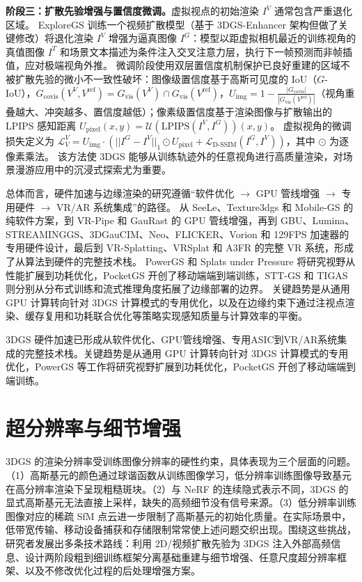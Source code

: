 \textbf{阶段三：扩散先验增强与置信度微调。}虚拟视点的初始渲染 $I^V$ 通常包含严重退化区域。
ExploreGS 训练一个视频扩散模型（基于 3DGS-Enhancer 架构但做了关键修改）将退化渲染 $I^V$ 增强为逼真图像 $I^G$：模型以距虚拟相机最近的训练视角的真值图像 $I^T$ 和场景文本描述为条件注入交叉注意力层，执行下一帧预测而非帧插值，应对极端视角外推。
微调阶段使用双层置信度机制保护已良好重建的区域不被扩散先验的微小不一致性破坏：图像级置信度基于高斯可见度的 IoU（$G$-IoU），$G_\text{covis}(V^V, V^\text{ref}) = G_\text{vis}(V^V) \cap G_\text{vis}(V^\text{ref})$，$U_\text{img} = 1 - \frac{|G_\text{covis}|}{|G_\text{vis}(V^\text{ref})|}$（视角重叠越大、冲突越多、置信度越低）；像素级置信度基于渲染图像与扩散输出的 LPIPS 感知距离 $U_\text{pixel}(x,y) = \mathcal{U}(\text{LPIPS}(I^V, I^G))(x,y)$。
虚拟视角的微调损失定义为 $\mathcal{L}_V^V = U_\text{img} \cdot (||I^G - I^V||_1 \odot U_\text{pixel} + \mathcal{L}_\text{D-SSIM}(I^G, I^V))$，其中 $\odot$ 为逐像素乘法。
该方法使 3DGS 能够从训练轨迹外的任意视角进行高质量渲染，对场景漫游应用中的沉浸式探索尤为重要。

总体而言，硬件加速与边缘渲染的研究遵循“软件优化 $\to$ GPU 管线增强 $\to$ 专用硬件 $\to$ VR/AR 系统集成”的路径。
从 SeeLe、Texture3dgs 和 Mobile-GS 的纯软件方案，到 VR-Pipe 和 GauRast 的 GPU 管线增强，再到 GBU、Lumina、STREAMINGGS、3DGauCIM、Neo、FLICKER、Vorion 和 129FPS 加速器的专用硬件设计，最后到 VR-Splatting、VRSplat 和 A3FR 的完整 VR 系统，形成了从算法到硬件的完整技术栈。
PowerGS 和 Splats under Pressure 将研究视野从性能扩展到功耗优化，PocketGS 开创了移动端端到端训练，STT-GS 和 TIGAS 则分别从分布式训练和流式推理角度拓展了边缘部署的边界。
关键趋势是从通用 GPU 计算转向针对 3DGS 计算模式的专用优化，以及在边缘约束下通过注视点渲染、缓存复用和功耗联合优化等策略实现感知质量与计算效率的平衡。

\begin{takeaway}
3DGS 硬件加速已形成从软件优化、GPU管线增强、专用ASIC到VR/AR系统集成的完整技术栈。关键趋势是从通用 GPU 计算转向针对 3DGS 计算模式的专用优化，PowerGS 等工作将研究视野扩展到功耗优化，PocketGS 开创了移动端端到端训练。
\end{takeaway}

\section{超分辨率与细节增强}
\label{sec:02_8}

3DGS 的渲染分辨率受训练图像分辨率的硬性约束，具体表现为三个层面的问题。（1）高斯基元的颜色通过球谐函数从训练图像学习，低分辨率训练图像导致基元在高分辨率渲染下呈现粗糙斑块。（2）与 NeRF 的连续隐式表示不同，3DGS 的显式高斯基元无法直接上采样，缺失的高频细节没有信号来源。（3）低分辨率训练图像对应的稀疏 SfM 点云进一步限制了高斯基元的初始化质量。在实际场景中，低带宽传输、移动设备捕获和存储限制常常使上述问题交织出现。围绕这些挑战，研究者发展出多条技术路线：利用 2D/视频扩散先验为 3DGS 注入外部高频信息、设计两阶段粗到细训练框架分离基础重建与细节增强、任意尺度超分辨率框架、以及不修改优化过程的后处理增强方案。

